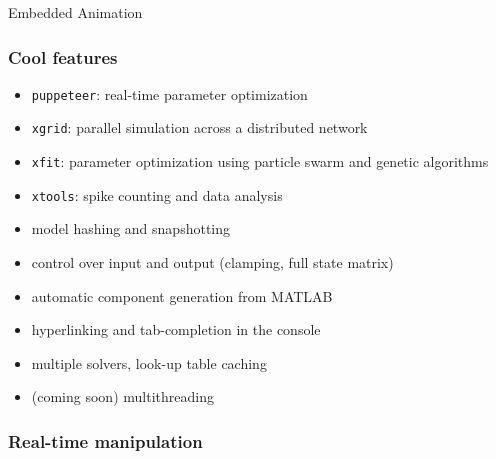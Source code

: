 \documentclass{beamer}
\begin{document}

\begin{frame}{Embedded Animation}
  \frametitle{Cool features}

    \begin{itemize}
      \item \texttt{puppeteer}: real-time parameter optimization
      \item \texttt{xgrid}: parallel simulation across a distributed network
      \item \texttt{xfit}: parameter optimization using particle swarm and genetic algorithms
      \item \texttt{xtools}: spike counting and data analysis
      \item model hashing and snapshotting
      \item control over input and output (clamping, full state matrix)
      \item automatic component generation from MATLAB
      \item hyperlinking and tab-completion in the console
      \item multiple solvers, look-up table caching
      \item (coming soon) multithreading
    \end{itemize}

\end{frame}


\begin{frame}
  \frametitle{Real-time manipulation}

    \begin{center}
    \end{center}

\end{frame}
\end{document}
